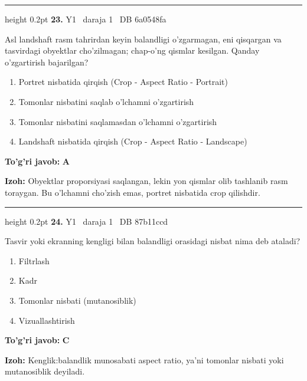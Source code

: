\documentclass[10pt,a4paper,oneside]{article}
\begin{document}
\vspace{2mm}\hrule height 0.2pt \vspace{4mm}
\hypertarget{q23}{\textbf{\color{ink}23.}}  {\color{muted}\scriptsize Y1 \textbullet\ daraja 1 \textbullet\ DB 6a0548fa}
\par
Asl landshaft rasm tahrirdan keyin balandligi o'zgarmagan, eni qisqargan va tasvirdagi obyektlar cho'zilmagan; chap-o'ng qismlar kesilgan. Qanday o'zgartirish bajarilgan?
\begin{enumerate}[label=\Alph*),leftmargin=9mm]
\item Portret nisbatida qirqish (Crop - Aspect Ratio - Portrait)
\item Tomonlar nisbatini saqlab o'lchamni o'zgartirish
\item Tomonlar nisbatini saqlamasdan o'lchamni o'zgartirish
\item Landshaft nisbatida qirqish (Crop - Aspect Ratio - Landscape)
\end{enumerate}
\begin{tcolorbox}[enhanced,breakable,colback=teal!4,colframe=teal!45!black,boxrule=0.45pt,arc=1.2mm,left=2.8mm,right=2.8mm,top=2mm,bottom=2mm,before skip=2mm,after skip=2mm]
\textbf{\color{teal}To'g'ri javob:} \textbf{A}
\par\smallskip
\textbf{Izoh:} Obyektlar proporsiyasi saqlangan, lekin yon qismlar olib tashlanib rasm toraygan. Bu o'lchamni cho'zish emas, portret nisbatida crop qilishdir.
\end{tcolorbox}
\vspace{2mm}\hrule height 0.2pt \vspace{4mm}
\hypertarget{q24}{\textbf{\color{ink}24.}}  {\color{muted}\scriptsize Y1 \textbullet\ daraja 1 \textbullet\ DB 87b11ccd}
\par
Tasvir yoki ekranning kengligi bilan balandligi orasidagi nisbat nima deb ataladi?
\begin{enumerate}[label=\Alph*),leftmargin=9mm]
\item Filtrlash
\item Kadr
\item Tomonlar nisbati (mutanosiblik)
\item Vizuallashtirish
\end{enumerate}
\begin{tcolorbox}[enhanced,breakable,colback=teal!4,colframe=teal!45!black,boxrule=0.45pt,arc=1.2mm,left=2.8mm,right=2.8mm,top=2mm,bottom=2mm,before skip=2mm,after skip=2mm]
\textbf{\color{teal}To'g'ri javob:} \textbf{C}
\par\smallskip
\textbf{Izoh:} Kenglik:balandlik munosabati aspect ratio, ya'ni tomonlar nisbati yoki mutanosiblik deyiladi.
\end{tcolorbox}
\end{document}
